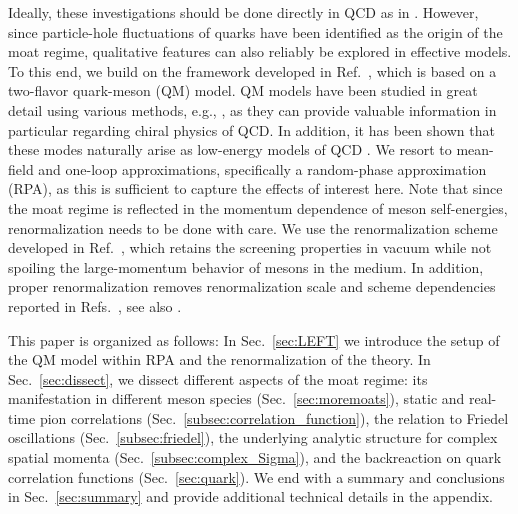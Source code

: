 \documentclass[reprint,english,superscriptaddress,preprintnumbers,amsmath,amssymb,aps,prd]{revtex4-2}
\def\Sec#1{Sec.~\ref{#1}}
\begin{document}
Ideally, these investigations should be done directly in QCD as in \cite{Fu:2019hdw, Fu:2024rto, Pawlowski:2025jpg, Fu:2026qnl}. However, since particle-hole fluctuations of quarks have been identified as the origin of the moat regime, qualitative features can also reliably be explored in effective models. To this end, we build on the framework developed in Ref.\ \cite{Rennecke:2025kub}, which is based on a two-flavor quark-meson (QM) model. QM models have been studied in great detail using various methods, e.g., \cite{Gell-Mann:1960mvl, Jungnickel:1995fp, Schaefer:2004en, Tripolt:2013jra, Pawlowski:2014zaa, Kovacs:2016juc}, as they can provide valuable information in particular regarding chiral physics of QCD. In addition, it has been shown that these modes naturally arise as low-energy models of QCD \cite{Braun:2014ata, Rennecke:2015eba, Rennecke:2015lur, Cyrol:2017ewj, Fu:2019hdw, Ihssen:2024miv}. We resort to mean-field and one-loop approximations, specifically a random-phase approximation (RPA), as this is sufficient to capture the effects of interest here. Note that since the moat regime is reflected in the momentum dependence of meson self-energies, renormalization needs to be done with care. We use the renormalization scheme developed in Ref.\ \cite{Rennecke:2025kub}, which retains the screening properties in vacuum while not spoiling the large-momentum behavior of mesons in the medium. In addition, proper renormalization removes renormalization scale and scheme dependencies reported in Refs.\  \cite{Partyka:2008sv, Buballa:2020nsi, Pannullo:2023cat, Pannullo:2024sov}, see also \cite{daSilva:2026plc}.

This paper is organized as follows: In \Sec{sec:LEFT} we introduce the setup of the QM model within RPA and the renormalization of the theory. In \Sec{sec:dissect}, we dissect different aspects of the moat regime: its manifestation in different meson species (\Sec{sec:moremoats}), static and real-time pion correlations (\Sec{subsec:correlation_function}), the relation to Friedel oscillations (\Sec{subsec:friedel}), the underlying analytic structure for complex spatial momenta (\Sec{subsec:complex_Sigma}), and the backreaction on quark correlation functions (\Sec{sec:quark}). We end with a summary and conclusions in \Sec{sec:summary} and provide additional technical details in the appendix.
\end{document}
